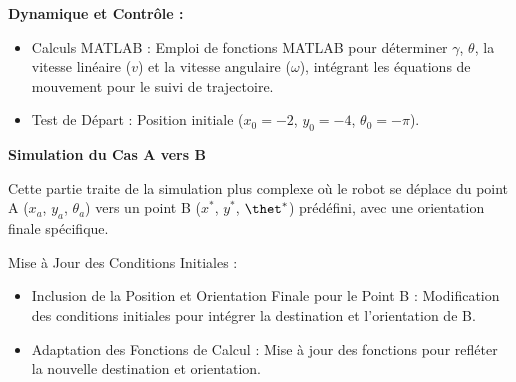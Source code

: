 \textbf{Dynamique et Contrôle :}

\begin{itemize}
    \item Calculs MATLAB : Emploi de fonctions MATLAB pour déterminer $\gamma$, $\theta$, la vitesse linéaire ($v$) et la vitesse angulaire ($\omega$), intégrant les équations de mouvement pour le suivi de trajectoire.
    \item Test de Départ : Position initiale ($x_0 = -2$, $y_0 = -4$, $\theta_0 = -\pi$).
\end{itemize}











\textbf{Simulation du Cas A vers B}


Cette partie traite de la simulation plus complexe où le robot se déplace du point A ($x_a$, $y_a$, $\theta_a$) vers un point B ($x^*$, $y^*$, $\thet^*$) prédéfini, avec une orientation finale spécifique.


Mise à Jour des Conditions Initiales :

\begin{itemize}
    \item Inclusion de la Position et Orientation Finale pour le Point B : Modification des conditions initiales pour intégrer la destination et l'orientation de B.
    \item Adaptation des Fonctions de Calcul : Mise à jour des fonctions pour refléter la nouvelle destination et orientation.
\end{itemize}

